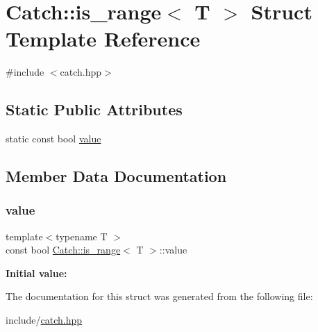 \hypertarget{struct_catch_1_1is__range}{}\section{Catch\+::is\+\_\+range$<$ T $>$ Struct Template Reference}
\label{struct_catch_1_1is__range}


{\ttfamily \#include $<$catch.\+hpp$>$}

\subsection*{Static Public Attributes}
\begin{DoxyCompactItemize}
\item 
static const bool \mbox{\hyperlink{struct_catch_1_1is__range_afaec39e819c3956829cbbd00feba11be}{value}}
\end{DoxyCompactItemize}


\subsection{Member Data Documentation}
\mbox{\label{struct_catch_1_1is__range_afaec39e819c3956829cbbd00feba11be}} 
\subsubsection{\texorpdfstring{value}{value}}
{\footnotesize\ttfamily template$<$typename T $>$ \\
const bool \mbox{\hyperlink{struct_catch_1_1is__range}{Catch\+::is\+\_\+range}}$<$ T $>$\+::value\hspace{0.3cm}{\ttfamily [static]}}

{\bfseries Initial value\+:}
\begin{DoxyCode}{0}
\DoxyCodeLine{=}

\end{DoxyCode}


The documentation for this struct was generated from the following file\+:\begin{DoxyCompactItemize}
\item 
include/\mbox{\hyperlink{catch_8hpp}{catch.\+hpp}}\end{DoxyCompactItemize}
